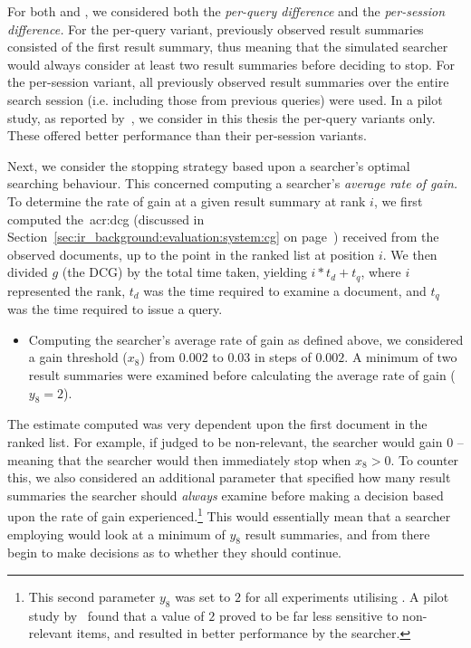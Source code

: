 
For both  and , we considered both the \emph{per-query difference} and the \emph{per-session difference.} For the per-query variant, previously observed result summaries consisted of the first result summary, thus meaning that the simulated searcher would always consider at least two result summaries before deciding to stop. For the per-session variant, all previously observed result summaries over the entire search session (i.e. including those from previous queries) were used. In a pilot study, as reported by~\cite{maxwell2015initial_stopping}, we consider in this thesis the per-query variants only. These offered better performance than their per-session variants.

Next, we consider the stopping strategy based upon a searcher's optimal searching behaviour. This concerned computing a searcher's \emph{average rate of gain.} To determine the rate of gain at a given result summary at rank $i$, we first computed the~\gls{acr:dcg} (discussed in Section~\ref{sec:ir_background:evaluation:system:cg} on page~\pageref{sec:ir_background:evaluation:system:cg}) received from the observed documents, up to the point in the ranked list at position $i$. We then divided $g$ (the DCG) by the total time taken, yielding $i * t_d + t_q$, where $i$ represented the rank, $t_d$ was the time required to examine a document, and $t_q$ was the time required to issue a query.

\begin{itemize}
    \item{ Computing the searcher's average rate of gain as defined above, we considered a gain threshold ($x_8$) from $0.002$ to $0.03$ in steps of $0.002$. A minimum of two result summaries were examined before calculating the average rate of gain ($y_8=2$).}
\end{itemize}

The estimate computed was very dependent upon the first document in the ranked list. For example, if judged to be non-relevant, the searcher would gain $0$ -- meaning that the searcher would then immediately stop when $x_8 > 0$. To counter this, we also considered an additional parameter that specified how many result summaries the searcher should \emph{always} examine before making a decision based upon the rate of gain experienced.\footnote{This second parameter $y_8$ was set to $2$ for all experiments utilising . A pilot study by~\cite{maxwell2015stopping_strategies} found that a value of $2$ proved to be far less sensitive to non-relevant items, and resulted in better performance by the searcher.} This would essentially mean that a searcher employing  would look at a minimum of $y_8$ result summaries, and from there begin to make decisions as to whether they should continue.

